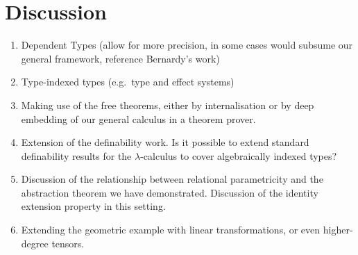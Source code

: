 \section{Discussion}
\label{sec:discussion}

\begin{enumerate}
\item Dependent Types (allow for more precision, in some cases would
  subsume our general framework, reference Bernardy's work)
\item Type-indexed types (e.g.~type and effect systems)
\item Making use of the free theorems, either by internalisation or by
  deep embedding of our general calculus in a theorem prover.
\item Extension of the definability work. Is it possible to extend
  standard definability results for the $\lambda$-calculus to cover
  algebraically indexed types?
\item Discussion of the relationship between relational parametricity
  and the abstraction theorem we have demonstrated. Discussion of the
  identity extension property in this setting.
\item Extending the geometric example with linear transformations, or
  even higher-degree tensors.
\end{enumerate}

